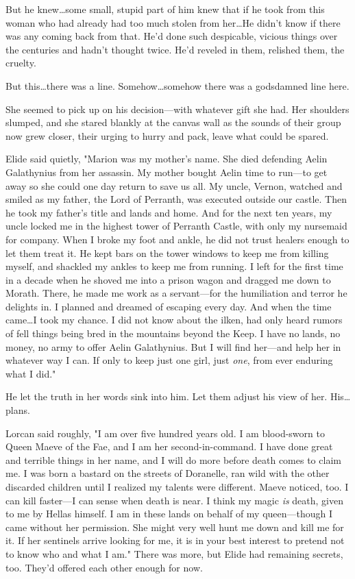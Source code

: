 But he knew\ldots some small, stupid part of him knew that if he took from this woman who had already had too much stolen from her\ldots He didn't know if there was any coming back from that.
He'd done such despicable, vicious things over the centuries and hadn't thought twice.
He'd reveled in them, relished them, the cruelty.

But this\ldots there was a line.
Somehow\ldots somehow there was a godsdamned line here.

She seemed to pick up on his decision---with whatever gift she had.
Her shoulders slumped, and she stared blankly at the canvas wall as the sounds of their group now grew closer, their urging to hurry and pack, leave what could be spared.

Elide said quietly, "Marion was my mother's name.
She died defending Aelin Galathynius from her assassin.
My mother bought Aelin time to run---to get away so she could one day return to save us all.
My uncle, Vernon, watched and smiled as my father, the Lord of Perranth, was executed outside our castle.
Then he took my father's title and lands and home.
And for the next ten years, my uncle locked me in the highest tower of Perranth Castle, with only my nursemaid for company.
When I broke my foot and ankle, he did not trust healers enough to let them treat it.
He kept bars on the tower windows to keep me from killing myself, and shackled my ankles to keep me from running.
I left for the first time in a decade when he shoved me into a prison wagon and dragged me down to Morath.
There, he made me work as a servant---for the humiliation and terror he delights in.
I planned and dreamed of escaping every day.
And when the time came\ldots I took my chance.
I did not know about the ilken, had only heard rumors of fell things being bred in the mountains beyond the Keep.
I have no lands, no money, no army to offer Aelin Galathynius.
But I will find her---and help her in whatever way I can.
If only to keep just one girl, just \emph{one}, from ever enduring what I did."

He let the truth in her words sink into him.
Let them adjust his view of her.
His\ldots plans.

Lorcan said roughly, "I am over five hundred years old.
I am blood-sworn to Queen Maeve of the Fae, and I am her second-in-command.
I have done great and terrible things in her name, and I will do more before death comes to claim me.
I was born a bastard on the streets of Doranelle, ran wild with the other discarded children until I realized my talents were different.
Maeve noticed, too.
I can kill faster---I can sense when death is near.
I think my magic \emph{is} death, given to me by Hellas himself.
I am in these lands on behalf of my queen---though I came without her permission.
She might very well hunt me down and kill me for it.
If her sentinels arrive looking for me, it is in your best interest to pretend not to know who and what I am."
There was more, but  Elide had remaining secrets, too.
They'd offered each other enough for now.

